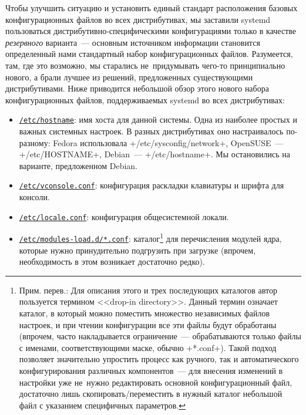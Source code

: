 \documentclass[10pt,oneside,a4paper]{article}
\newcommand{\hreftt}[2]{\href{#1}{\texttt{#2}}}
\begin{document}
Чтобы улучшить ситуацию и установить единый стандарт расположения базовых
конфигурационных файлов во всех дистрибутивах, мы заставили systemd пользоваться
дистрибутивно-специфическими конфигурациями только в качестве \emph{резервного}
варианта~--- основным источником информации становится определенный нами
стандартный набор конфигурационных файлов. Разумеется, там, где это возможно, мы
старались не~придумывать чего-то принципиально нового, а брали лучшее из
решений, предложенных существующими дистрибутивами. Ниже приводится небольшой
обзор этого нового набора конфигурационных файлов, поддерживаемых systemd во
всех дистрибутивах:
\begin{itemize}
	\item
		\hreftt{http://www.freedesktop.org/software/systemd/man/hostname.html}%
		{/etc/hostname}:
		имя хоста для данной системы. Одна из наиболее простых и важных
		системных настроек. В разных дистрибутивах оно настраивалось
		по-разному: Fedora использовала +/etc/sysconfig/network+,
		OpenSUSE~--- +/etc/HOSTNAME+, Debian~--- +/etc/hostname+. Мы
		остановились на варианте, предложенном Debian.
	\item
		\hreftt{http://www.freedesktop.org/software/systemd/man/vconsole.conf.html}%
		{/etc/vconsole.conf}:
		конфигурация раскладки клавиатуры и шрифта для консоли.
	\item
		\hreftt{http://www.freedesktop.org/software/systemd/man/locale.conf.html}%
		{/etc/locale.conf}:
		конфигурация общесистемной локали.
	\item
		\hreftt{http://www.freedesktop.org/software/systemd/man/modules-load.d.html}%
		{/etc/modules-load.d/*.conf}:
		каталог\footnote{Прим. перев.: Для описания этого и трех
		последующих каталогов автор пользуется термином <<drop-in
		directory>>. Данный термин означает каталог, в который можно
		поместить множество независимых файлов настроек, и при чтении
		конфигурации все эти файлы будут обработаны (впрочем, часто
		накладывается ограничение~--- обрабатываются только файлы с
		именами, соответствующими маске, обычно +*.conf+). Такой подход
		позволяет значительно упростить процесс как ручного, так и
		автоматического конфигурирования различных компонентов~--- для
		внесения изменений в настройки уже не~нужно редактировать
		основной конфигурационный файл, достаточно лишь
		скопировать/переместить в нужный каталог небольшой файл с
		указанием специфичных параметров.} для перечисления модулей
		ядра, которые нужно принудительно подгрузить при загрузке
		(впрочем, необходимость в этом возникает достаточно редко).

\end{itemize}
\end{document}
